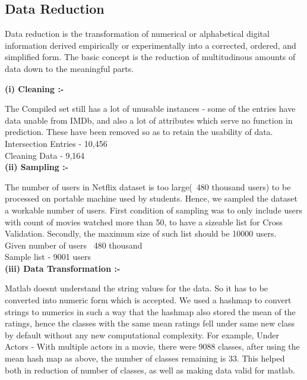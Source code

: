 \documentclass[11pt]{article}
\begin{document}
\subsection{Data Reduction}
Data reduction is the transformation of numerical or alphabetical digital information derived empirically or experimentally into a corrected, ordered, and simplified form. The basic concept is the reduction of multitudinous amounts of data down to the meaningful parts.



    {\bfseries (i) Cleaning :-}
    
    The Compiled set still has a lot of unusable instances - some of the entries have data unable from IMDb, and also a lot of attributes which serve no function in prediction. These have been removed so as to retain the usability of data.\\Intersection Entries - 10,456\\
    Cleaning Data - 9,164\\
    
    
    
    {\bfseries (ii) Sampling :-}
    
    The number of users in Netflix dataset is too large(~480 thousand users) to be processed on portable machine used by students. Hence, we sampled the dataset a workable number of users. First condition of sampling was to only include users with count of movies watched more than 50, to have a sizeable list for Cross Validation. Secondly, the maximum size of such list should be 10000 users.\\
    Given number of users ~480 thousand\\ Sample list - 9001 users\\
    
    {\bfseries (iii) Data Transformation :-}
    
    Matlab doesnt understand the string values for the data. So it has to be converted into numeric form which is accepted. We used a hashmap to convert strings to numerics in such a way that the hashmap also stored the mean of the ratings, hence the classes with the same mean ratings fell under same new class by default without any new computational complexity. For example,
    		Under Actors - With multiple actors in a movie, there were 9088 classes, after using the mean hash map as above, the number of classes remaining is 33. This helped both in reduction of number of classes, as well as making data valid for matlab.
\end{document}
